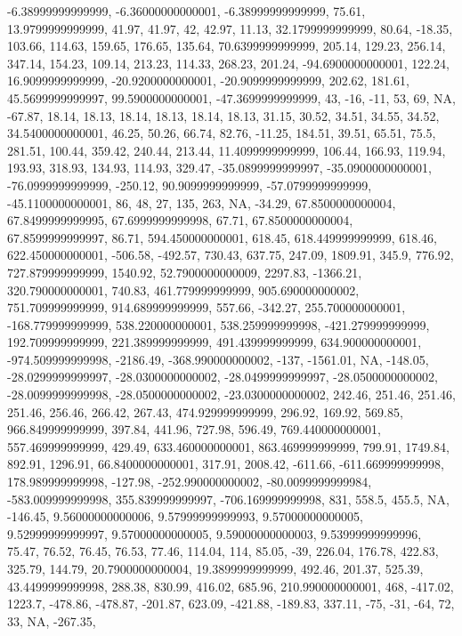 \documentclass[
]{article}
\begin{document}
-6.38999999999999, -6.36000000000001, -6.38999999999999, 75.61,
13.9799999999999, 41.97, 41.97, 42, 42.97, 11.13, 32.1799999999999,
80.64, -18.35, 103.66, 114.63, 159.65, 176.65, 135.64, 70.6399999999999,
205.14, 129.23, 256.14, 347.14, 154.23, 109.14, 213.23, 114.33, 268.23,
201.24, -94.6900000000001, 122.24, 16.9099999999999, -20.9200000000001,
-20.9099999999999, 202.62, 181.61, 45.5699999999997, 99.5900000000001,
-47.3699999999999, 43, -16, -11, 53, 69, NA, -67.87, 18.14, 18.13,
18.14, 18.13, 18.14, 18.13, 31.15, 30.52, 34.51, 34.55, 34.52,
34.5400000000001, 46.25, 50.26, 66.74, 82.76, -11.25, 184.51, 39.51,
65.51, 75.5, 281.51, 100.44, 359.42, 240.44, 213.44, 11.4099999999999,
106.44, 166.93, 119.94, 193.93, 318.93, 134.93, 114.93, 329.47,
-35.0899999999997, -35.0900000000001, -76.0999999999999, -250.12,
90.9099999999999, -57.0799999999999, -45.1100000000001, 86, 48, 27, 135,
263, NA, -34.29, 67.8500000000004, 67.8499999999995, 67.6999999999998,
67.71, 67.8500000000004, 67.8599999999997, 86.71, 594.450000000001,
618.45, 618.449999999999, 618.46, 622.450000000001, -506.58, -492.57,
730.43, 637.75, 247.09, 1809.91, 345.9, 776.92, 727.879999999999,
1540.92, 52.7900000000009, 2297.83, -1366.21, 320.790000000001, 740.83,
461.779999999999, 905.690000000002, 751.709999999999, 914.689999999999,
557.66, -342.27, 255.700000000001, -168.779999999999, 538.220000000001,
538.259999999998, -421.279999999999, 192.709999999999, 221.389999999999,
491.439999999999, 634.900000000001, -974.509999999998, -2186.49,
-368.990000000002, -137, -1561.01, NA, -148.05, -28.0299999999997,
-28.0300000000002, -28.0499999999997, -28.0500000000002,
-28.0099999999998, -28.0500000000002, -23.0300000000002, 242.46, 251.46,
251.46, 251.46, 256.46, 266.42, 267.43, 474.929999999999, 296.92,
169.92, 569.85, 966.849999999999, 397.84, 441.96, 727.98, 596.49,
769.440000000001, 557.469999999999, 429.49, 633.460000000001,
863.469999999999, 799.91, 1749.84, 892.91, 1296.91, 66.8400000000001,
317.91, 2008.42, -611.66, -611.669999999998, 178.989999999998, -127.98,
-252.990000000002, -80.0099999999984, -583.009999999998,
355.839999999997, -706.169999999998, 831, 558.5, 455.5, NA, -146.45,
9.56000000000006, 9.57999999999993, 9.57000000000005, 9.52999999999997,
9.57000000000005, 9.59000000000003, 9.53999999999996, 75.47, 76.52,
76.45, 76.53, 77.46, 114.04, 114, 85.05, -39, 226.04, 176.78, 422.83,
325.79, 144.79, 20.7900000000004, 19.3899999999999, 492.46, 201.37,
525.39, 43.4499999999998, 288.38, 830.99, 416.02, 685.96,
210.990000000001, 468, -417.02, 1223.7, -478.86, -478.87, -201.87,
623.09, -421.88, -189.83, 337.11, -75, -31, -64, 72, 33, NA, -267.35,
\end{document}
